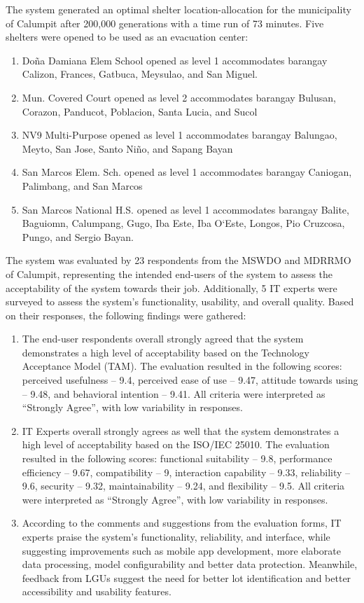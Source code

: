 	The system generated an optimal shelter location-allocation for the municipality of Calumpit after 200,000 generations with a time run of 73 minutes. Five shelters were opened to be used as an evacuation center: 
	
	\begin{enumerate}
		\item Doña Damiana Elem School opened as level 1 accommodates barangay Calizon, Frances, Gatbuca, Meysulao, and San Miguel.
		\item Mun. Covered Court opened as level 2 accommodates barangay Bulusan, Corazon, Panducot, Poblacion, Santa Lucia, and Sucol
		\item NV9 Multi-Purpose opened as level 1 accommodates barangay Balungao, Meyto, San Jose, Santo Niño, and Sapang Bayan
		\item San Marcos Elem. Sch. opened as level 1 accommodates barangay Caniogan, Palimbang, and San Marcos
		\item San Marcos National H.S. opened as level 1 accommodates barangay Balite, Baguiomn, Calumpang, Gugo, Iba Este, Iba O`Este, Longos, Pio Cruzcosa, Pungo, and Sergio Bayan.
	\end{enumerate}

	The system was evaluated by 23 respondents from the MSWDO and MDRRMO of Calumpit, representing the intended end-users of the system to assess the acceptability of the system towards their job. Additionally, 5 IT experts were surveyed to assess the system’s functionality, usability, and overall quality. Based on their responses, the following findings were gathered:
	
	\begin{enumerate}
		\item The end-user respondents overall strongly agreed that the system demonstrates a high level of acceptability based on the Technology Acceptance Model (TAM). The evaluation resulted in the following scores: perceived usefulness – 9.4, perceived ease of use – 9.47, attitude towards using – 9.48, and behavioral intention – 9.41. All criteria were interpreted as “Strongly Agree”, with low variability in responses.
		\item IT Experts overall strongly agrees as well that the system demonstrates a high level of acceptability based on the ISO/IEC 25010. The evaluation resulted in the following scores: functional suitability – 9.8, performance efficiency – 9.67, compatibility – 9, interaction capability – 9.33, reliability – 9.6, security – 9.32, maintainability – 9.24, and flexibility – 9.5. All criteria were interpreted as “Strongly Agree”, with low variability in responses.
		\item According to the comments and suggestions from the evaluation forms, IT experts praise the system's functionality, reliability, and interface, while suggesting improvements such as mobile app development, more elaborate data processing, model configurability and better data protection. Meanwhile, feedback from LGUs suggest the need for better lot identification and better accessibility and usability features.
	\end{enumerate}

